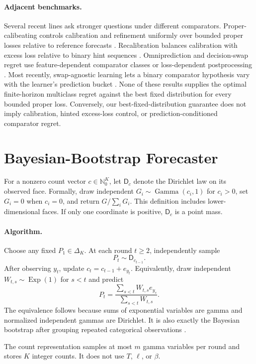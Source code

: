 \documentclass[twoside]{article}
\newcommand{\D}{\mathsf D}
\begin{document}
\paragraph{Adjacent benchmarks.} Several recent lines ask stronger questions under different comparators. Proper-calibeating controls calibration and refinement uniformly over bounded proper losses relative to reference forecasts \citep{fosterhart2026}. Recalibration balances calibration with excess loss relative to binary hint sequences \citep{hu2026recalibration}. Omniprediction and decision-swap regret use feature-dependent comparator classes or loss-dependent postprocessing \citep{okoroafor2025,lu2025,hu2026blackwell}. Most recently, swap-agnostic learning lets a binary comparator hypothesis vary with the learner's prediction bucket \citep{okoroafor2026}. None of these results supplies the optimal finite-horizon multiclass regret against the best fixed distribution for every bounded proper loss. Conversely, our best-fixed-distribution guarantee does not imply calibration, hinted excess-loss control, or prediction-conditioned comparator regret.

\section{Bayesian-Bootstrap Forecaster}

For a nonzero count vector $c\in\mathbb N_0^K$, let $\D_c$ denote the Dirichlet law on its observed face. Formally, draw independent $G_i\sim\operatorname{Gamma}(c_i,1)$ for $c_i>0$, set $G_i=0$ when $c_i=0$, and return $G/\sum_iG_i$. This definition includes lower-dimensional faces. If only one coordinate is positive, $\D_c$ is a point mass.

\paragraph{Algorithm.} Choose any fixed $P_1\in\Delta_K$. At each round $t\geq2$, independently sample
\[ P_t\sim\D_{c_{t-1}}. \tag{BB} \] After observing $y_t$, update $c_t=c_{t-1}+e_{y_t}$. Equivalently, draw independent $W_{t,s}\sim\operatorname{Exp}(1)$ for $s<t$ and predict \[ P_t=\frac{\sum_{s<t}W_{t,s}e_{y_s}}{\sum_{s<t}W_{t,s}}. \] The equivalence follows because sums of exponential variables are gamma and normalized independent gammas are Dirichlet. It is also exactly the Bayesian bootstrap after grouping repeated categorical observations \citep{rubin1981}.

The count representation samples at most $m$ gamma variables per round and stores $K$ integer counts. It does not use $T$, $\ell$, or $\beta$.
\end{document}
